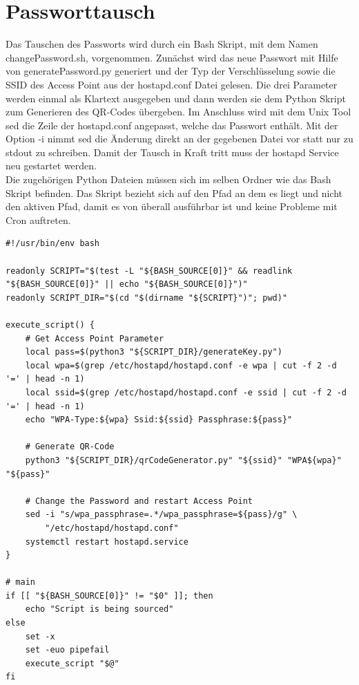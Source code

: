\documentclass[a4paper,11pt,singlespacing]{article}
\begin{document}
    	\section{Passworttausch}
    		Das Tauschen des Passworts wird durch ein Bash Skript, mit dem Namen changePassword.sh, vorgenommen. Zunächst wird das neue Passwort mit Hilfe von generatePassword.py generiert und der Typ der Verschlüsselung sowie die SSID des Access Point aus der hostapd.conf Datei gelesen. Die drei Parameter werden einmal als Klartext ausgegeben und dann werden sie dem Python Skript zum Generieren des QR-Codes übergeben. Im Anschluss wird mit dem Unix Tool sed die Zeile der hostapd.conf angepasst, welche das Passwort enthält. Mit der Option -i nimmt sed die Änderung direkt an der gegebenen Datei vor statt nur zu stdout zu schreiben. Damit der Tausch in Kraft tritt muss der hostapd Service neu gestartet werden. \\ 
    		Die zugehörigen Python Dateien müssen sich im selben Ordner wie das Bash Skript befinden. Das Skript bezieht sich auf den Pfad an dem es liegt und nicht den aktiven Pfad, damit es von überall ausführbar ist und keine Probleme mit Cron auftreten.  \\
    	\begin{lstlisting}
#!/usr/bin/env bash

readonly SCRIPT="$(test -L "${BASH_SOURCE[0]}" && readlink "${BASH_SOURCE[0]}" || echo "${BASH_SOURCE[0]}")"
readonly SCRIPT_DIR="$(cd "$(dirname "${SCRIPT}")"; pwd)"

execute_script() {
	# Get Access Point Parameter
	local pass=$(python3 "${SCRIPT_DIR}/generateKey.py")         
	local wpa=$(grep /etc/hostapd/hostapd.conf -e wpa | cut -f 2 -d '=' | head -n 1)
	local ssid=$(grep /etc/hostapd/hostapd.conf -e ssid | cut -f 2 -d '=' | head -n 1)
	echo "WPA-Type:${wpa} Ssid:${ssid} Passphrase:${pass}" 

	# Generate QR-Code
	python3 "${SCRIPT_DIR}/qrCodeGenerator.py" "${ssid}" "WPA${wpa}" "${pass}"

	# Change the Password and restart Access Point
	sed -i "s/wpa_passphrase=.*/wpa_passphrase=${pass}/g" \
		"/etc/hostapd/hostapd.conf"
	systemctl restart hostapd.service
}

# main
if [[ "${BASH_SOURCE[0]}" != "$0" ]]; then
	echo "Script is being sourced"
else
	set -x
	set -euo pipefail
	execute_script "$@"
fi  	
    	\end{lstlisting}
\end{document}
